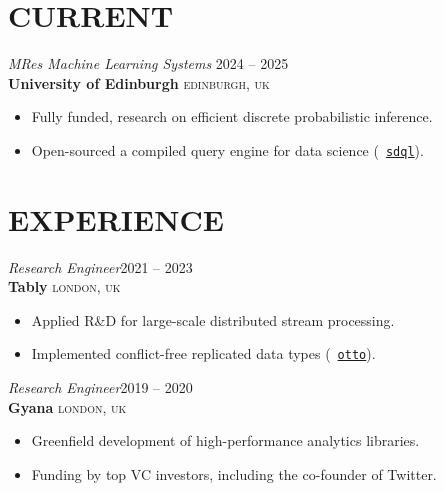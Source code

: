 \documentclass[line, margin]{res}
\begin{document}


\address{\small\texttt{
\faGlobe \ \url{https://www.sparsity.ai}\ \ \ \ \ \ \ \ \ \ \ \ \ \ \ \ \ \ \ \ \
\faPhone \ \href{tel:+44-74533-31777}{+44 74 5333 1777}\ \
\faEnvelope \ \href{mailto:alexander.mascolo@gmail.com}{\nolinkurl{alexander.mascolo@gmail.com}}
}}

\begin{resume}

\section{CURRENT}

{\sl MRes Machine Learning Systems}
\hfill 2024 -- 2025\\
\textbf{University of Edinburgh} \hfill \textsc{edinburgh, uk}
\vspace{4pt}
\begin{itemize}
	\item Fully funded, research on efficient discrete probabilistic inference.
	\item Open-sourced a compiled query engine for data science (\faGithub\  \href{https://github.com/edin-dal/sdql}{\texttt{sdql}}).
\end{itemize}

\section{EXPERIENCE}

{\sl Research Engineer}\hfill 2021 -- 2023\\
\textbf{Tably} \hfill \textsc{london, uk}
\vspace{4pt}
	\begin{itemize}
		\item Applied R\&D for large-scale distributed stream processing.
		\item Implemented conflict-free replicated data types (\faGithub\  \href{https://github.com/tablyinc/otto-test}{\texttt{otto}}).
	\end{itemize}

{\sl Research Engineer}\hfill 2019 -- 2020\\
\textbf{Gyana} \hfill \textsc{london, uk}
\vspace{4pt}
	\begin{itemize}
		\item Greenfield development of high-performance analytics libraries.
		\item Funding by top VC investors, including the co-founder of Twitter.
	\end{itemize}


\end{resume}
\end{document}

